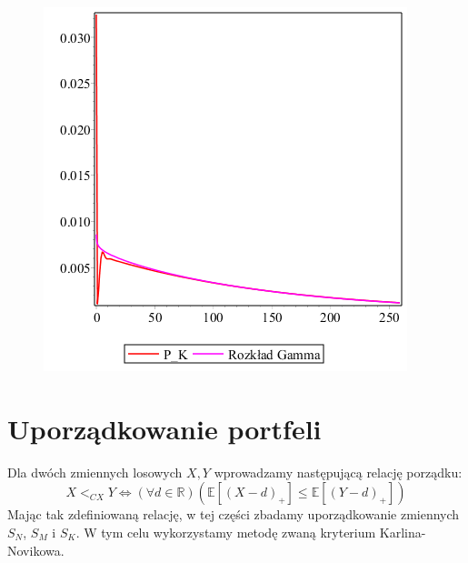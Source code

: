 \documentclass[12pt]{article}
\theoremstyle{twierdzenie}
\theoremstyle{definition}
\begin{document}
\begin{figure}[H]
\begin{center}
\includegraphics[scale=.5]{gammadlaK}
\end{center}
\end{figure}
\section{Uporządkowanie portfeli}
Dla dwóch zmiennych losowych $X,Y$ wprowadzamy następującą relację porządku:
$$X<_{CX}Y\Leftrightarrow (\forall d\in\mathbb{R})\left(\mathbb{E}\left[(X-d)_+\right]\leq \mathbb{E}\left[(Y-d)_+\right]\right)$$
Mając tak zdefiniowaną relację, w tej części zbadamy uporządkowanie zmiennych $S_N$, $S_M$ i $S_K$. W tym celu wykorzystamy metodę zwaną kryterium Karlina-Novikowa.
\end{document}
